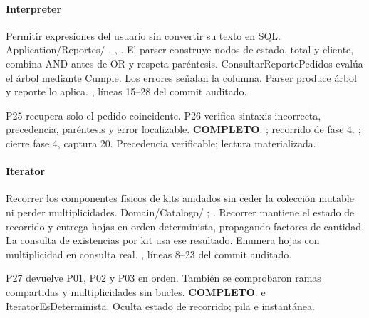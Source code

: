 \paragraph{Interpreter}
 Permitir expresiones del usuario sin convertir su texto en SQL.
 Application/Reportes/ , , . El parser construye nodos de estado, total y cliente, combina AND antes de OR y respeta paréntesis. ConsultarReportePedidos evalúa el árbol mediante Cumple. Los errores señalan la columna.
 Parser produce árbol y reporte lo aplica.
 , líneas 15--28 del commit auditado.

 P25 recupera solo el pedido coincidente. P26 verifica sintaxis incorrecta, precedencia, paréntesis y error localizable. \textbf{COMPLETO}.
 ; recorrido de fase 4. ; cierre fase 4, captura 20.
 Precedencia verificable; lectura materializada.
\medskip
\clearpage
\paragraph{Iterator}
 Recorrer los componentes físicos de kits anidados sin ceder la colección mutable ni perder multiplicidades.
 Domain/Catalogo/ ; . Recorrer mantiene el estado de recorrido y entrega hojas en orden determinista, propagando factores de cantidad. La consulta de existencias por kit usa ese resultado.
 Enumera hojas con multiplicidad en consulta real.
 , líneas 8--23 del commit auditado.

 P27 devuelve P01, P02 y P03 en orden. También se comprobaron ramas compartidas y multiplicidades sin bucles. \textbf{COMPLETO}.
  e IteratorEsDeterminista.
 Oculta estado de recorrido; pila e instantánea.
\medskip
\clearpage
